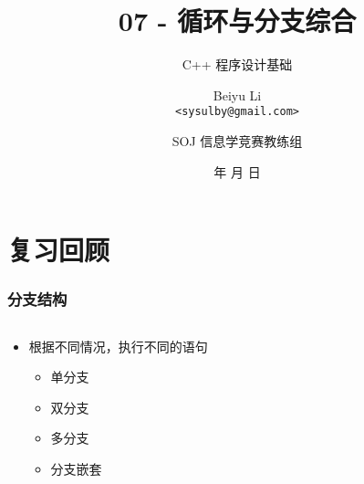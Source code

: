 \title[07 - 循环与分支综合]
{07 - 循环与分支综合}

\subtitle{C++ 程序设计基础}

\author[Beiyu Li]
{Beiyu Li\\
\texttt{<sysulby@gmail.com>}}


\date[\today]
{\number\year 年 \number\month 月 \number\day 日}




\author[sysulby]
{SOJ 信息学竞赛教练组}

\begin{frame}
    \titlepage
\end{frame}
\setcounter{framenumber}{0} %


\section{复习回顾}

\begin{frame}[fragile]
    \frametitle{分支结构}

    \begin{columns}[T]
        \begin{overlayarea}{\textwidth}{.6\textheight}
            \begin{itemize}[<+->]
                \item 根据不同情况，执行不同的语句

                    \begin{itemize}
                        \item 单分支
                        \item 双分支
                        \item 多分支
                        \item 分支嵌套
                    \end{itemize}

            \end{itemize}
        \end{overlayarea}

    \end{columns}
\end{frame}

